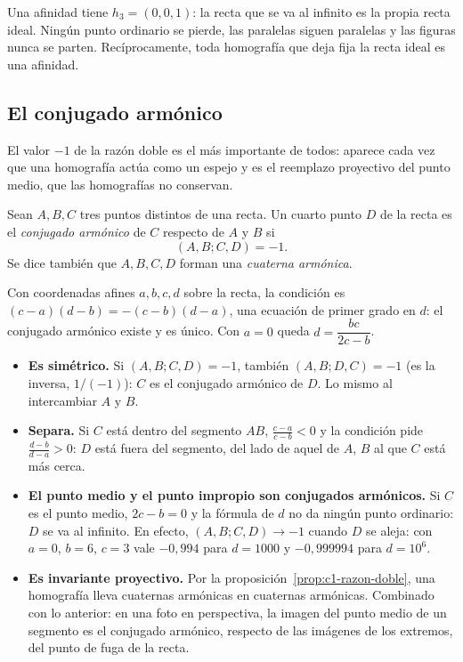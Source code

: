 \begin{atencion}
Una afinidad tiene \(h_3=(0,0,1)\): la recta que se va al infinito es la propia recta ideal.
Ningún punto ordinario se pierde, las paralelas siguen paralelas y las figuras nunca se
parten. Recíprocamente, toda homografía que deja fija la recta ideal es una afinidad.
\end{atencion}

\subsection{El conjugado armónico}\label{sec:conjugado-armonico}

El valor \(-1\) de la razón doble es el más importante de todos: aparece cada vez que una
homografía actúa como un espejo y es el reemplazo proyectivo del punto medio, que las
homografías no conservan.

\begin{definicion}\label{def:conjugado-armonico}
Sean \(A,B,C\) tres puntos distintos de una recta. Un cuarto punto \(D\) de la recta es el
\emph{conjugado armónico} de \(C\) respecto de \(A\) y \(B\) si
\[
  (A,B;C,D)=-1 .
\]
Se dice también que \(A,B,C,D\) forman una \emph{cuaterna armónica}.
\end{definicion}

Con coordenadas afines \(a,b,c,d\) sobre la recta, la condición es
\((c-a)(d-b)=-(c-b)(d-a)\), una ecuación de primer grado en \(d\): el conjugado armónico
existe y es único. Con \(a=0\) queda \(d=\dfrac{bc}{2c-b}\).

\begin{resultado}
\begin{itemize}
  \item \textbf{Es simétrico.} Si \((A,B;C,D)=-1\), también \((A,B;D,C)=-1\) (es la inversa,
  \(1/(-1)\)): \(C\) es el conjugado armónico de \(D\). Lo mismo al intercambiar \(A\) y \(B\).
  \item \textbf{Separa.} Si \(C\) está dentro del segmento \(AB\), \(\frac{c-a}{c-b}<0\) y la
  condición pide \(\frac{d-b}{d-a}>0\): \(D\) está fuera del segmento, del lado de aquel de
  \(A\), \(B\) al que \(C\) está más cerca.
  \item \textbf{El punto medio y el punto impropio son conjugados armónicos.} Si \(C\) es el
  punto medio, \(2c-b=0\) y la fórmula de \(d\) no da ningún punto ordinario: \(D\) se va al
  infinito. En efecto, \((A,B;C,D)\to-1\) cuando \(D\) se aleja: con \(a=0\), \(b=6\),
  \(c=3\) vale \(-0{,}994\) para \(d=1000\) y \(-0{,}999994\) para \(d=10^6\).
  \item \textbf{Es invariante proyectivo.} Por la proposición~\ref{prop:c1-razon-doble}, una
  homografía lleva cuaternas armónicas en cuaternas armónicas. Combinado con lo anterior:
  en una foto en perspectiva, la imagen del punto medio de un segmento es el conjugado
  armónico, respecto de las imágenes de los extremos, del punto de fuga de la recta.
\end{itemize}
\end{resultado}


